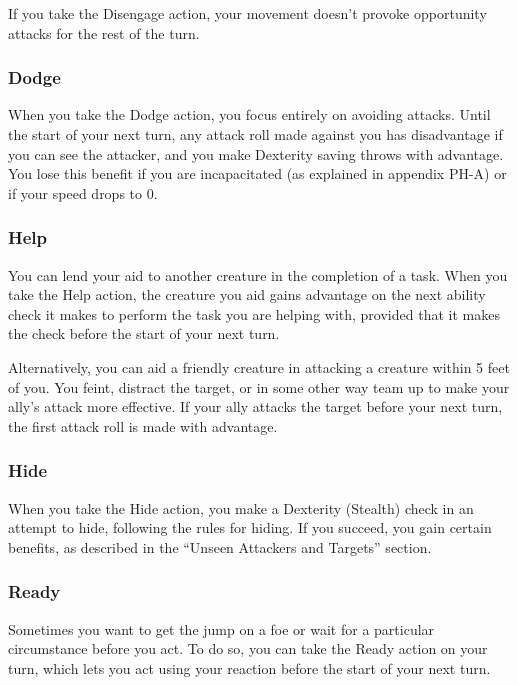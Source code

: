 \documentclass[
]{article}
\begin{document}
If you take the Disengage action, your movement doesn't provoke
opportunity attacks for the rest of the turn.

\hypertarget{dodge}{%
\subsubsection{Dodge}\label{dodge}}

When you take the Dodge action, you focus entirely on avoiding attacks.
Until the start of your next turn, any attack roll made against you has
disadvantage if you can see the attacker, and you make Dexterity saving
throws with advantage. You lose this benefit if you are incapacitated
(as explained in appendix PH-A) or if your speed drops to 0.

\hypertarget{help}{%
\subsubsection{Help}\label{help}}

You can lend your aid to another creature in the completion of a task.
When you take the Help action, the creature you aid gains advantage on
the next ability check it makes to perform the task you are helping
with, provided that it makes the check before the start of your next
turn.

Alternatively, you can aid a friendly creature in attacking a creature
within 5 feet of you. You feint, distract the target, or in some other
way team up to make your ally's attack more effective. If your ally
attacks the target before your next turn, the first attack roll is made
with advantage.

\hypertarget{hide}{%
\subsubsection{Hide}\label{hide}}

When you take the Hide action, you make a Dexterity (Stealth) check in
an attempt to hide, following the rules for hiding. If you succeed, you
gain certain benefits, as described in the ``Unseen Attackers and
Targets'' section.

\hypertarget{ready}{%
\subsubsection{Ready}\label{ready}}

Sometimes you want to get the jump on a foe or wait for a particular
circumstance before you act. To do so, you can take the Ready action on
your turn, which lets you act using your reaction before the start of
your next turn.
\end{document}
